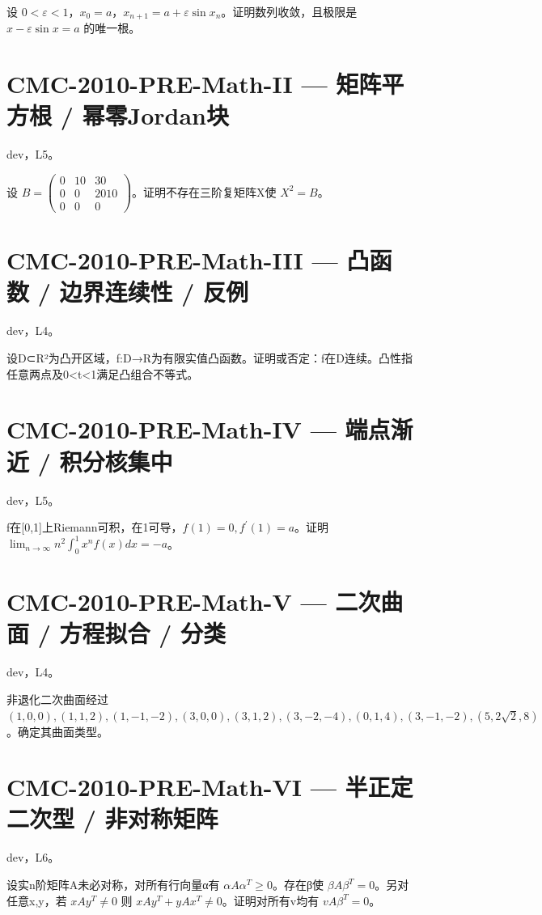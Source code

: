 \documentclass[UTF8]{ctexart}
\begin{document}
设 $0<\varepsilon<1$，$x_0=a$，$x_{n+1}=a+\varepsilon\sin x_n$。证明数列收敛，且极限是 $x-\varepsilon\sin x=a$ 的唯一根。

\section*{CMC-2010-PRE-Math-II — 矩阵平方根 / 幂零Jordan块}

dev，L5。

设 $B=\begin{pmatrix}0&10&30\\0&0&2010\\0&0&0\end{pmatrix}$。证明不存在三阶复矩阵X使 $X^2=B$。

\section*{CMC-2010-PRE-Math-III — 凸函数 / 边界连续性 / 反例}

dev，L4。

设D⊂R²为凸开区域，f:D→R为有限实值凸函数。证明或否定：f在D连续。凸性指任意两点及0<t<1满足凸组合不等式。

\section*{CMC-2010-PRE-Math-IV — 端点渐近 / 积分核集中}

dev，L5。

f在[0,1]上Riemann可积，在1可导，$f(1)=0,f^{\prime}(1)=a$。证明 $\lim_{n\to\infty}n^2\int_0^1x^nf(x)dx=-a$。

\section*{CMC-2010-PRE-Math-V — 二次曲面 / 方程拟合 / 分类}

dev，L4。

非退化二次曲面经过 $(1,0,0),(1,1,2),(1,-1,-2),(3,0,0),(3,1,2),(3,-2,-4),(0,1,4),(3,-1,-2),(5,2\sqrt2,8)$。确定其曲面类型。

\section*{CMC-2010-PRE-Math-VI — 半正定二次型 / 非对称矩阵}

dev，L6。

设实n阶矩阵A未必对称，对所有行向量α有 $\alpha A\alpha^T\ge0$。存在β使 $\beta A\beta^T=0$。另对任意x,y，若 $xAy^T\ne0$ 则 $xAy^T+yAx^T\ne0$。证明对所有v均有 $vA\beta^T=0$。
\end{document}
